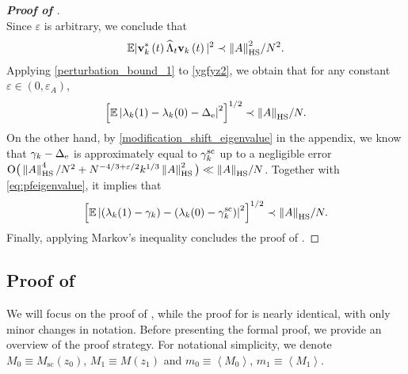 \documentclass[10pt,reqno]{amsart}
\numberwithin{equation}{section}
\numberwithin{figure}{section}
\theoremstyle{plain} %
\theoremstyle{definition} %
\newcommand{\wh}{\widehat}
\renewcommand{\txt}[1]{\text{\rm{#1}}}
\newcommand{\E}{\mathbb{E}}
\newcommand{\pa}[1]{\left({#1}\right)}
\newcommand{\qa}[1]{\left[{#1}\right]}
\newcommand{\norma}[1]{\left\lVert #1 \right\rVert}
\newcommand{\avga}[1]{\left\langle #1 \right\rangle}
\newcommand{\hLambda}{{\wh{\Lambda}}}
\newcommand{\OO}{\mathrm{O}}
\newcommand{\HS}{\txt{HS}}
\newcommand{\tsc}{{\mathrm{sc}}}
\numberwithin{equation}{section}
\begin{document}
\begin{proof}[\bf Proof of ]
\begin{equation}
    \end{equation}
    Since $\varepsilon$ is arbitrary, we conclude that
    \begin{equation}\label{perturbation_bound_1}
        \begin{aligned}
            \E|{\bf v}_{k}^*\pa{t} \hLambda_{t}{\bf v}_{k}\pa{t}|^2\prec {\norma{A}_{\HS}^2}/{N^2}.
        \end{aligned}
    \end{equation}
  Applying \eqref{perturbation_bound_1} to \eqref{ygfyz2}, we obtain that for any constant $\varepsilon\in (0,\varepsilon_A)$,
    \begin{equation}\label{eq:pfeigenvalue}
        \begin{aligned}
            \qa{\mathbb E\left|\lambda_k(1)-\lambda_k(0)-\Delta_{\txt{e}} \right|^2}^{1/2}\prec {\norma{A}_{\HS}}/{N}.
        \end{aligned}
    \end{equation}
On the other hand, by \eqref{modification_shift_eigenvalue} in the appendix, we know that $\gamma_k -\Delta_{\txt{e}}$ is approximately equal to $\gamma_{k}^{\txt{sc}}$ up to a negligible error $\OO\big(\norma{A}_{\HS}^4/N^2+N^{-4/3+\varepsilon/2}k^{1/3}\norma{A}_{\HS}^2\big)\ll  {\norma{A}_{\HS}}/{N}$. Together with \eqref{eq:pfeigenvalue}, it implies that  
     \begin{equation}\nonumber
        \begin{aligned}
            \qa{\mathbb E\left|\pa{\lambda_k(1)-\gamma_k}-\pa{\lambda_k(0)-\gamma_{k}^{\txt{sc}}}\right|^2}^{1/2}\prec %
            {\norma{A}_{\HS}}/{N}.
        \end{aligned}
    \end{equation}
    Finally, applying Markov's inequality concludes the proof of .
\end{proof}






\subsection{Proof of }\label{subsection:proof_of_lemma_localized_eigenvector_local_law_and_lemma_localized_eigenvalue_local_law}

We will focus on the proof of , while the proof for  is nearly identical, with only minor changes in notation. Before presenting the formal proof, we provide an overview of the proof strategy. For notational simplicity, we denote $M_0\equiv M_\tsc(z_0)$, $M_1\equiv M(z_1)$ and $m_0\equiv \avga{M_0}$, $m_1\equiv \avga{M_1}$.
\end{document}
